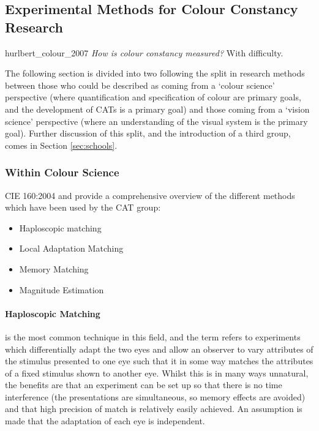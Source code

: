 \subsection{Experimental Methods for Colour Constancy Research}
\label{sec:methodsforCC}

\begin{citequote}{hurlbert_colour_2007}
\emph{How is colour constancy measured?} With difficulty.
\end{citequote}

The following section is divided into two following the split in research methods between those who could be described as coming from a `colour science' perspective (where quantification and specification of colour are primary goals, and the development of \glspl{CAT} is a primary goal) and those coming from a `vision science' perspective (where an understanding of the visual system is the primary goal). Further discussion of this split, and the introduction of a third group, comes in Section \ref{sec:schools}.

\subsubsection{Within Colour Science}

CIE 160:2004 \citep{cie_tc_1-52_cie_2004} and \citet{luo_review_2000} provide a comprehensive overview of the different methods which have been used by the \gls{CAT} group:

\begin{itemize}
\item Haploscopic matching
\item Local Adaptation Matching
\item Memory Matching
\item Magnitude Estimation
\end{itemize}


\paragraph{Haploscopic Matching} is the most common technique in this field, and the term refers to experiments which differentially adapt the two eyes and allow an observer to vary attributes of the stimulus presented to one eye such that it in some way matches the attributes of a fixed stimulus shown to another eye. Whilst this is in many ways unnatural, the benefits are that an experiment can be set up so that there is no time interference (the presentations are simultaneous, so memory effects are avoided) and that high precision of match is relatively easily achieved. An assumption is made that the adaptation of each eye is independent.

